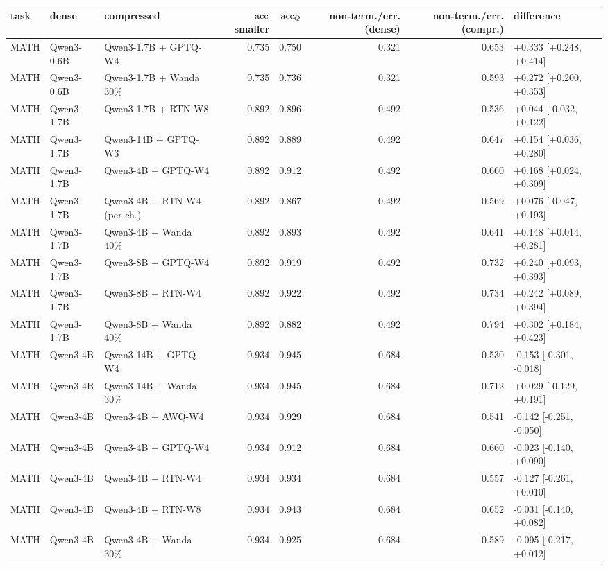 \begin{tabular}{lllrrrrl}
\toprule
task & dense & compressed & $\mathrm{acc}$ smaller & $\mathrm{acc}_Q$ & non-term./err. (dense) & non-term./err. (compr.) & difference \\
\midrule
MATH & Qwen3-0.6B & Qwen3-1.7B + GPTQ-W4 & 0.735 & 0.750 & 0.321 & 0.653 & +0.333 [+0.248, +0.414] \\
MATH & Qwen3-0.6B & Qwen3-1.7B + Wanda 30\% & 0.735 & 0.736 & 0.321 & 0.593 & +0.272 [+0.200, +0.353] \\
MATH & Qwen3-1.7B & Qwen3-1.7B + RTN-W8 & 0.892 & 0.896 & 0.492 & 0.536 & +0.044 [-0.032, +0.122] \\
MATH & Qwen3-1.7B & Qwen3-14B + GPTQ-W3 & 0.892 & 0.889 & 0.492 & 0.647 & +0.154 [+0.036, +0.280] \\
MATH & Qwen3-1.7B & Qwen3-4B + GPTQ-W4 & 0.892 & 0.912 & 0.492 & 0.660 & +0.168 [+0.024, +0.309] \\
MATH & Qwen3-1.7B & Qwen3-4B + RTN-W4 (per-ch.) & 0.892 & 0.867 & 0.492 & 0.569 & +0.076 [-0.047, +0.193] \\
MATH & Qwen3-1.7B & Qwen3-4B + Wanda 40\% & 0.892 & 0.893 & 0.492 & 0.641 & +0.148 [+0.014, +0.281] \\
MATH & Qwen3-1.7B & Qwen3-8B + GPTQ-W4 & 0.892 & 0.919 & 0.492 & 0.732 & +0.240 [+0.093, +0.393] \\
MATH & Qwen3-1.7B & Qwen3-8B + RTN-W4 & 0.892 & 0.922 & 0.492 & 0.734 & +0.242 [+0.089, +0.394] \\
MATH & Qwen3-1.7B & Qwen3-8B + Wanda 40\% & 0.892 & 0.882 & 0.492 & 0.794 & +0.302 [+0.184, +0.423] \\
MATH & Qwen3-4B & Qwen3-14B + GPTQ-W4 & 0.934 & 0.945 & 0.684 & 0.530 & -0.153 [-0.301, -0.018] \\
MATH & Qwen3-4B & Qwen3-14B + Wanda 30\% & 0.934 & 0.945 & 0.684 & 0.712 & +0.029 [-0.129, +0.191] \\
MATH & Qwen3-4B & Qwen3-4B + AWQ-W4 & 0.934 & 0.929 & 0.684 & 0.541 & -0.142 [-0.251, -0.050] \\
MATH & Qwen3-4B & Qwen3-4B + GPTQ-W4 & 0.934 & 0.912 & 0.684 & 0.660 & -0.023 [-0.140, +0.090] \\
MATH & Qwen3-4B & Qwen3-4B + RTN-W4 & 0.934 & 0.934 & 0.684 & 0.557 & -0.127 [-0.261, +0.010] \\
MATH & Qwen3-4B & Qwen3-4B + RTN-W8 & 0.934 & 0.943 & 0.684 & 0.652 & -0.031 [-0.140, +0.082] \\
MATH & Qwen3-4B & Qwen3-4B + Wanda 30\% & 0.934 & 0.925 & 0.684 & 0.589 & -0.095 [-0.217, +0.012] \\

\end{tabular}
